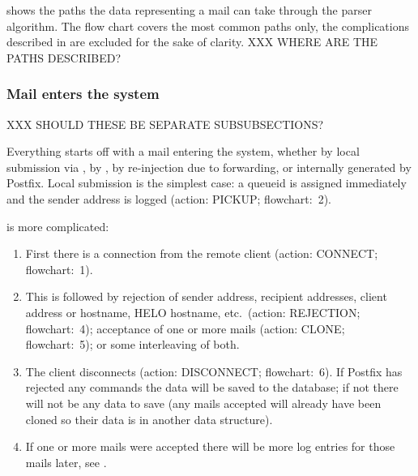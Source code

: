  shows the paths the data representing a mail
can take through the parser algorithm.  The flow chart covers the most
common paths only, the complications described in
 are excluded for the sake of clarity.  XXX WHERE
ARE THE PATHS DESCRIBED\@?


\clearpage

\subsubsection{Mail enters the system}

\label{mail-enters-the-system}

XXX SHOULD THESE BE SEPARATE SUBSUBSECTIONS\@?

Everything starts off with a mail entering the system, whether by local
submission via , by \SMTP{}, by re-injection due to
forwarding, or internally generated by Postfix.  Local submission is the
simplest case: a queueid is assigned immediately and the sender address is
logged (action: PICKUP\@; flowchart:~2).

\SMTP{} is more complicated:

\begin{enumerate}

    \item First there is a connection from the remote client (action:
        CONNECT\@; flowchart:~1).

    \item This is followed by rejection of sender address, recipient
        addresses, client \IP{} address or hostname, HELO hostname, etc.\
        (action: REJECTION\@; flowchart:~4); acceptance of one or more
        mails (action: CLONE\@; flowchart:~5); or some interleaving of
        both.

    \item The client disconnects (action: DISCONNECT\@; flowchart:~6).  If
        Postfix has rejected any \SMTP{} commands the data will be saved to
        the database; if not there will not be any data to save (any mails
        accepted will already have been cloned so their data is in another
        data structure).

    \item If one or more mails were accepted there will be more log entries
        for those mails later, see \sectionref{mail-delivery}.

\end{enumerate}

